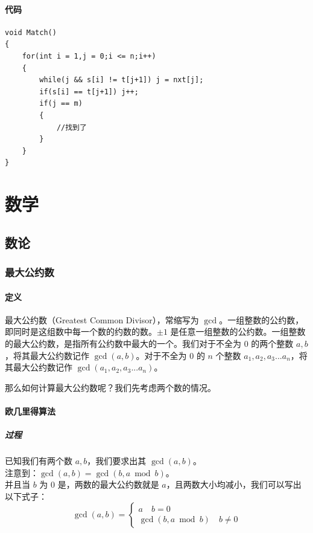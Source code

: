 \documentclass[11pt,oneside,a4paper,UTF8]{book}
\begin{document}
	\subsection{代码}
	\begin{lstlisting}
void Match()
{
	for(int i = 1,j = 0;i <= n;i++)
	{
		while(j && s[i] != t[j+1]) j = nxt[j];
		if(s[i] == t[j+1]) j++;
		if(j == m)
		{
			//找到了
		}
	}
}
	\end{lstlisting}
	
	\part{数学}
	\chapter{数论}
	\section{最大公约数}
	\subsection{定义}
	最大公约数（Greatest Common Divisor），常缩写为 $\gcd$。一组整数的公约数，即同时是这组数中每一个数的约数的数。$\pm 1$ 是任意一组整数的公约数。一组整数的最大公约数，是指所有公约数中最大的一个。我们对于不全为 $0$ 的两个整数 $a,b$，将其最大公约数记作 $\gcd(a,b)$。对于不全为 $0$ 的 $n$ 个整数 $a_1,a_2,a_3 ... a_n$，将其最大公约数记作 $\gcd(a_1,a_2,a_3...a_n)$。\par
	那么如何计算最大公约数呢？我们先考虑两个数的情况。
	\subsection{欧几里得算法}
	\subsubsection{过程}
	\noindent
	已知我们有两个数 $a,b$，我们要求出其 $\gcd(a,b)$。\\
	注意到：$\gcd(a,b) = \gcd(b,a \bmod b)$。\\
	并且当 $b$ 为 $0$ 是，两数的最大公约数就是 $a$，且两数大小均减小，我们可以写出以下式子：\\
	\begin{equation}
	\gcd(a,b) =\left\{
		\begin{aligned}
			a \quad b = 0\\
			\gcd(b,a \bmod b) \quad b\not= 0
		\end{aligned}
		\right
		.
	\end{equation}
\end{document}
